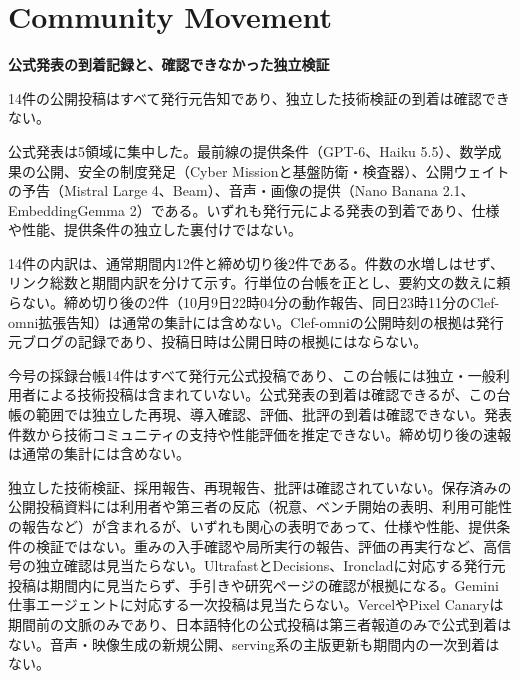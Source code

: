 \section{Community Movement}
\begin{wideflow}
{\Large\bfseries 公式発表の到着記録と、確認できなかった独立検証}\par
\smallskip
{\color{SurveyMuted}14件の公開投稿はすべて発行元告知であり、独立した技術検証の到着は確認できない。}\par
\end{wideflow}

公式発表は5領域に集中した。最前線の提供条件（GPT-6、Haiku 5.5）、数学成果の公開、安全の制度発足（Cyber Missionと基盤防衛・検査器）、公開ウェイトの予告（Mistral Large 4、Beam）、音声・画像の提供（Nano Banana 2.1、EmbeddingGemma 2）である\cite{gpt6ui}\cite{mathrelease}\cite{haiku55}\cite{cybermission}\cite{mistral4}\cite{beam}\cite{nanobanana}\cite{embedgemma2}。いずれも発行元による発表の到着であり、仕様や性能、提供条件の独立した裏付けではない。

14件の内訳は、通常期間内12件と締め切り後2件である\cite{gpt6ui}\cite{mathrelease}\cite{haiku55}\cite{cybermission}\cite{mistral4}\cite{beam}\cite{nanobanana}\cite{embedgemma2}\cite{clefomni}。件数の水増しはせず、リンク総数と期間内訳を分けて示す。行単位の台帳を正とし、要約文の数えに頼らない。締め切り後の2件（10月9日22時04分の動作報告、同日23時11分のClef-omni拡張告知）は通常の集計には含めない\cite{clefomni}。Clef-omniの公開時刻の根拠は発行元ブログの記録であり、投稿日時は公開日時の根拠にはならない。

\begin{communitynote}
今号の採録台帳14件はすべて発行元公式投稿であり、この台帳には独立・一般利用者による技術投稿は含まれていない。公式発表の到着は確認できるが、この台帳の範囲では独立した再現、導入確認、評価、批評の到着は確認できない。発表件数から技術コミュニティの支持や性能評価を推定できない。締め切り後の速報は通常の集計には含めない。
\end{communitynote}

独立した技術検証、採用報告、再現報告、批評は確認されていない。保存済みの公開投稿資料には利用者や第三者の反応（祝意、ベンチ開始の表明、利用可能性の報告など）が含まれるが、いずれも関心の表明であって、仕様や性能、提供条件の検証ではない。重みの入手確認や局所実行の報告、評価の再実行など、高信号の独立確認は見当たらない。UltrafastとDecisions、Ironcladに対応する発行元投稿は期間内に見当たらず、手引きや研究ページの確認が根拠になる\cite{ultrafast}\cite{decisions}\cite{ironclad}。Gemini仕事エージェントに対応する一次投稿は見当たらない\cite{geminiagent}。VercelやPixel Canaryは期間前の文脈のみであり、日本語特化の公式投稿は第三者報道のみで公式到着はない。音声・映像生成の新規公開、serving系の主版更新も期間内の一次到着はない。

